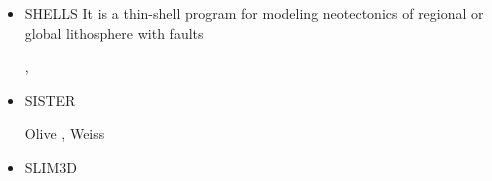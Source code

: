 \begin{itemize}
\begin{scriptsize}
\begin{itemize}
\item[\twothousandeleven]    \textcite{vahs11},  \textcite{java11},  \textcite{vayj11}
\item[\twothousandtwelve]    \textcite{besy12},  \textcite{beva12},  
                             \textcite{chgv12}, \textcite{vakn12}
\item[\twothousandthirteen]  \textcite{ancv13},  \textcite{cibi13},  \textcite{bova13}
\item[\twothousandfourteen]  \textcite{chsg14},  \textcite{mova14},  \textcite{chsv14}
\item[\twothousandfifteen]   \textcite{vasy15},  \textcite{cibi15},  \textcite{mori15}
\item[\twothousandseventeen] \textcite{civj17},  \textcite{wewv17}
\item[\twothousandeighteen]  \textcite{spcv18},  \textcite{chss18}
\item[\twothousandnineteen]  \textcite{zhdv19},  \textcite{vayu19},  \textcite{casv19}, 
                             \textcite{vaws19},  \textcite{cibi19}
\item[\twothousandtwenty]    \textcite{moku20}
\item[\twothousandtwentyone] \textcite{pocv21},  \textcite{mota21}
\end{itemize}
\end{scriptsize}

\item {\codefont SHELLS} 
It is a thin-shell program for modeling neotectonics of
regional or global lithosphere with faults

\begin{scriptsize}
\textcite{kobi95}, \textcite{nebs02}
\end{scriptsize}

\item {\codefont SISTER} 

\begin{scriptsize}
Olive \etal \cite{olbm16}, Weiss \etal \cite{weib18}
\end{scriptsize}

\item {\codefont SLIM3D} 


\end{itemize}

